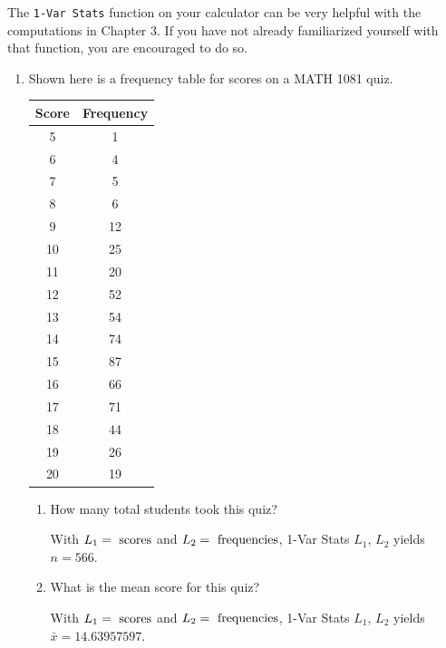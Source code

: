 \documentclass{article}
\newcommand{\answer}[1]{\color{red}#1}
\begin{document}
\pagestyle{myheadings}

\begin{center}
\textbf{}
\end{center}

The \texttt{1-Var Stats} function on your calculator can be very helpful with the computations in Chapter 3.  If you have not already familiarized yourself with that function, you are encouraged to do so.

\begin{enumerate}
\item Shown here is a frequency table for scores on a MATH 1081 quiz.
\begin{center}
\begin{tabular}{c|c}
\hspace{1cm} Score \hspace{1cm} & \hspace{1cm} Frequency \hspace{1cm} \\
\hline
5 & 1 \\
6 & 4 \\
7 & 5 \\
8 & 6 \\
9 & 12 \\
10 & 25 \\
11 &  20 \\
12 & 52 \\
13 & 54 \\
14 & 74 \\
15 & 87 \\
16 & 66 \\
17 & 71 \\
18 & 44 \\
19 & 26 \\
20 & 19 \\
\end{tabular}
\end{center}
	\begin{enumerate}
	\item How many total students took this quiz?
	
	{\answer{With $L_1 = \textnormal{ scores}$ and $L_2 = \textnormal{ frequencies}$,
	1-Var Stats $L_1$, $L_2$ yields $n=566$.}} 
		
	\item What is the mean score for this quiz?
	
	{\answer{With $L_1 = \textnormal{ scores}$ and $L_2 = \textnormal{ frequencies}$,
	1-Var Stats $L_1$, $L_2$ yields $\bar{x} = 14.63957597$.}} 


\end{enumerate}
\end{enumerate}
\end{document}
